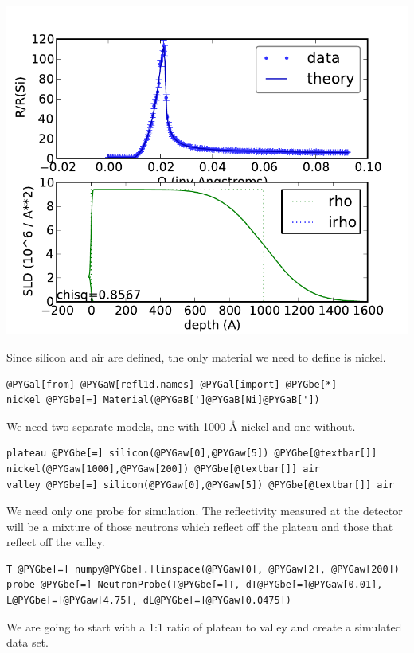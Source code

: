 \documentclass[letterpaper,10pt,english]{sphinxmanual}
\begin{document}
\includegraphics{059ce42618.pdf}

Since silicon and air are defined, the only material we need to
define is nickel.

\begin{Verbatim}[commandchars=@\[\]]
@PYGal[from] @PYGaW[refl1d.names] @PYGal[import] @PYGbe[*]
nickel @PYGbe[=] Material(@PYGaB[']@PYGaB[Ni]@PYGaB['])
\end{Verbatim}

We need two separate models, one with 1000 Å nickel and one without.

\begin{Verbatim}[commandchars=@\[\]]
plateau @PYGbe[=] silicon(@PYGaw[0],@PYGaw[5]) @PYGbe[@textbar[]] nickel(@PYGaw[1000],@PYGaw[200]) @PYGbe[@textbar[]] air
valley @PYGbe[=] silicon(@PYGaw[0],@PYGaw[5]) @PYGbe[@textbar[]] air
\end{Verbatim}

We need only one probe for simulation.  The reflectivity measured at
the detector will be a mixture of those neutrons which reflect off
the plateau and those that reflect off the valley.

\begin{Verbatim}[commandchars=@\[\]]
T @PYGbe[=] numpy@PYGbe[.]linspace(@PYGaw[0], @PYGaw[2], @PYGaw[200])
probe @PYGbe[=] NeutronProbe(T@PYGbe[=]T, dT@PYGbe[=]@PYGaw[0.01], L@PYGbe[=]@PYGaw[4.75], dL@PYGbe[=]@PYGaw[0.0475])
\end{Verbatim}

We are going to start with a 1:1 ratio of plateau to valley and create
a simulated data set.
\end{document}
